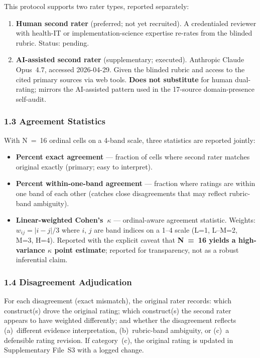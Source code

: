 This protocol supports two rater types, reported separately:
\begin{enumerate}
\item \textbf{Human second rater} (preferred; not yet recruited). A credentialed reviewer
  with health-IT or implementation-science expertise re-rates from the blinded rubric.
  Status: pending.
\item \textbf{AI-assisted second rater} (supplementary; executed). Anthropic Claude Opus~4.7,
  accessed 2026-04-29. Given the blinded rubric and access to the cited primary sources via
  web tools. \textbf{Does not substitute} for human dual-rating; mirrors the AI-assisted
  pattern used in the 17-source domain-presence self-audit.
\end{enumerate}

\subsubsection*{1.3 Agreement Statistics}

With N~=~16 ordinal cells on a 4-band scale, three statistics are reported jointly:
\begin{itemize}
\item \textbf{Percent exact agreement} --- fraction of cells where second rater matches
  original exactly (primary; easy to interpret).
\item \textbf{Percent within-one-band agreement} --- fraction where ratings are within one
  band of each other (catches close disagreements that may reflect rubric-band ambiguity).
\item \textbf{Linear-weighted Cohen's~$\kappa$} --- ordinal-aware agreement statistic.
  Weights: $w_{ij} = |i-j|/3$ where $i$, $j$ are band indices on a 1--4 scale
  (L=1, L--M=2, M=3, H=4). Reported with the explicit caveat that \textbf{N~=~16
  yields a high-variance $\kappa$ point estimate}; reported for transparency, not
  as a robust inferential claim.
\end{itemize}

\subsubsection*{1.4 Disagreement Adjudication}

For each disagreement (exact mismatch), the original rater records: which construct(s)
drove the original rating; which construct(s) the second rater appears to have weighted
differently; and whether the disagreement reflects (a)~different evidence interpretation,
(b)~rubric-band ambiguity, or (c)~a defensible rating revision. If category~(c), the
original rating is updated in Supplementary File~S3 with a logged change.


